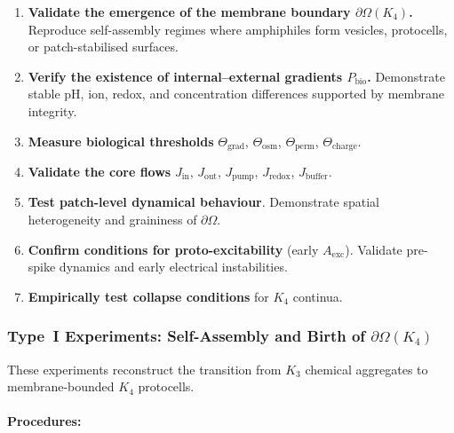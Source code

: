 \begin{enumerate}
    \item \textbf{Validate the emergence of the membrane boundary
          $\partial\Omega(K_4)$.}
          Reproduce self-assembly regimes where amphiphiles form vesicles,
          protocells, or patch-stabilised surfaces.

    \item \textbf{Verify the existence of internal--external gradients
          $P_{\mathrm{bio}}$.}
          Demonstrate stable pH, ion, redox, and concentration
          differences supported by membrane integrity.

    \item \textbf{Measure biological thresholds} $\Theta_{\mathrm{grad}}$,
          $\Theta_{\mathrm{osm}}$, $\Theta_{\mathrm{perm}}$,
          $\Theta_{\mathrm{charge}}$.

    \item \textbf{Validate the core flows}
          $J_{\mathrm{in}}$, $J_{\mathrm{out}}$, $J_{\mathrm{pump}}$,
          $J_{\mathrm{redox}}$, $J_{\mathrm{buffer}}$.

    \item \textbf{Test patch-level dynamical behaviour}.
          Demonstrate spatial heterogeneity and graininess of $\partial\Omega$.

    \item \textbf{Confirm conditions for proto-excitability} (early $A_{\mathrm{exc}}$).
          Validate pre-spike dynamics and early electrical instabilities.

    \item \textbf{Empirically test collapse conditions} for $K_4$ continua.
\end{enumerate}



\subsubsection{Type~I Experiments: Self-Assembly and Birth of \texorpdfstring{$\partial\Omega(K_4)$}{\partial\Omega(K_4)}}

These experiments reconstruct the transition from $K_3$ chemical
aggregates to membrane-bounded $K_4$ protocells.

\paragraph{Procedures:}

